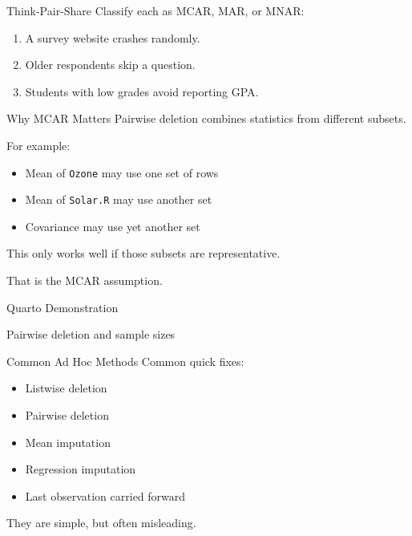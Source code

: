 \documentclass{beamer}
\begin{document}
\begin{frame}{Think-Pair-Share}
Classify each as MCAR, MAR, or MNAR:

\begin{enumerate}
  \item A survey website crashes randomly.
  \item Older respondents skip a question.
  \item Students with low grades avoid reporting GPA.
\end{enumerate}
\end{frame}

\begin{frame}{Why MCAR Matters}
Pairwise deletion combines statistics from different subsets.

\vspace{0.3cm}

For example:
\begin{itemize}
  \item Mean of \texttt{Ozone} may use one set of rows
  \item Mean of \texttt{Solar.R} may use another set
  \item Covariance may use yet another set
\end{itemize}

\vspace{0.3cm}
This only works well if those subsets are representative.

\vspace{0.3cm}
That is the MCAR assumption.
\end{frame}

\begin{frame}[plain]
\centering
\vfill
{\Huge Quarto Demonstration}

\vspace{0.5cm}

{\Large Pairwise deletion and sample sizes}

\vfill
\end{frame}

\begin{frame}{Common Ad Hoc Methods}
Common quick fixes:

\begin{itemize}
  \item Listwise deletion
  \item Pairwise deletion
  \item Mean imputation
  \item Regression imputation
  \item Last observation carried forward
\end{itemize}

\vspace{0.3cm}
They are simple, but often misleading.
\end{frame}
\end{document}
